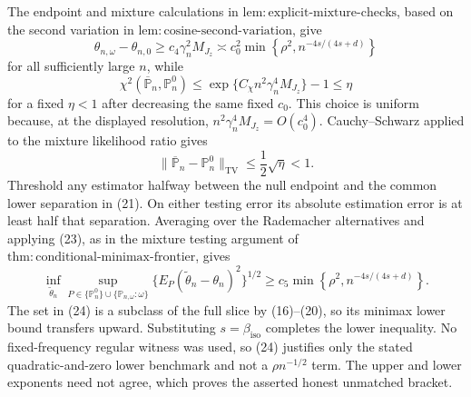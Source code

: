 The endpoint and mixture calculations in \(\mathrm{lem{:}explicit\text{-}mixture\text{-}checks}\), based on the second variation in \(\mathrm{lem{:}cosine\text{-}second\text{-}variation}\), give
\[
\theta_{n,\omega}-\theta_{n,0}
\ge c_4\gamma_n^2M_{J_z}
\asymp c_0^2\min\!\left\{\rho^2,n^{-4s/(4s+d)}\right\} \tag{21}
\]
for all sufficiently large \(n\), while
\[
\chi^2(\overline{\mathbb P}_n,\mathbb P_n^0)
\le\exp\{C_\chi n^2\gamma_n^4M_{J_z}\}-1
\le\eta \tag{22}
\]
for a fixed \(\eta<1\) after decreasing the same fixed \(c_0\).  This choice is uniform because, at the displayed resolution, \(n^2\gamma_n^4M_{J_z}=O(c_0^4)\).  Cauchy--Schwarz applied to the mixture likelihood ratio gives
\[
\|\overline{\mathbb P}_n-\mathbb P_n^0\|_{\mathrm{TV}}
\le\frac12\sqrt\eta<1. \tag{23}
\]
Threshold any estimator halfway between the null endpoint and the common lower separation in (21).  On either testing error its absolute estimation error is at least half that separation.  Averaging over the Rademacher alternatives and applying (23), as in the mixture testing argument of \(\mathrm{thm{:}conditional\text{-}minimax\text{-}frontier}\), gives
\[
\inf_{\widetilde\theta_n}
\sup_{P\in\{\mathbb P_n^0\}\cup\{\mathbb P_{n,\omega}:\omega\}}
\{E_P(\widetilde\theta_n-\theta_n)^2\}^{1/2}
\ge c_5\min\!\left\{\rho^2,n^{-4s/(4s+d)}\right\}. \tag{24}
\]
The set in (24) is a subclass of the full slice by (16)--(20), so its minimax lower bound transfers upward.  Substituting \(s=\beta_{\mathrm{iso}}\) completes the lower inequality.  No fixed-frequency regular witness was used, so (24) justifies only the stated quadratic-and-zero lower benchmark and not a \(\rho n^{-1/2}\) term.  The upper and lower exponents need not agree, which proves the asserted honest unmatched bracket.
